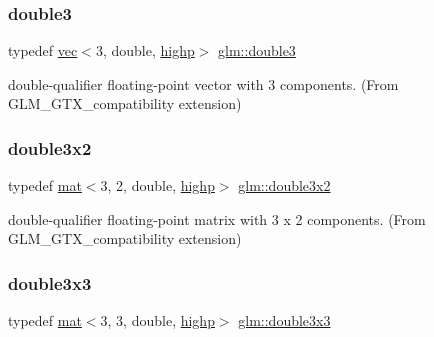 \subsubsection{\texorpdfstring{double3}{double3}}
{\footnotesize\ttfamily typedef \hyperlink{structglm_1_1vec}{vec}$<$3, double, \hyperlink{namespaceglm_a36ed105b07c7746804d7fdc7cc90ff25ac6f7eab42eacbb10d59a58e95e362074}{highp}$>$ \hyperlink{group__gtx__compatibility_ga59c2d0879cea219643aec2f75b8beee9}{glm\+::double3}}



double-\/qualifier floating-\/point vector with 3 components. (From G\+L\+M\+\_\+\+G\+T\+X\+\_\+compatibility extension) 

\mbox{\label{group__gtx__compatibility_ga92075f3b0988e062b5fcd25afb67e74c}} 
\subsubsection{\texorpdfstring{double3x2}{double3x2}}
{\footnotesize\ttfamily typedef \hyperlink{structglm_1_1mat}{mat}$<$3, 2, double, \hyperlink{namespaceglm_a36ed105b07c7746804d7fdc7cc90ff25ac6f7eab42eacbb10d59a58e95e362074}{highp}$>$ \hyperlink{group__gtx__compatibility_ga92075f3b0988e062b5fcd25afb67e74c}{glm\+::double3x2}}



double-\/qualifier floating-\/point matrix with 3 x 2 components. (From G\+L\+M\+\_\+\+G\+T\+X\+\_\+compatibility extension) 

\mbox{\label{group__gtx__compatibility_ga7cf33790969e0985a53ff01d914bf8ef}} 
\subsubsection{\texorpdfstring{double3x3}{double3x3}}
{\footnotesize\ttfamily typedef \hyperlink{structglm_1_1mat}{mat}$<$3, 3, double, \hyperlink{namespaceglm_a36ed105b07c7746804d7fdc7cc90ff25ac6f7eab42eacbb10d59a58e95e362074}{highp}$>$ \hyperlink{group__gtx__compatibility_ga7cf33790969e0985a53ff01d914bf8ef}{glm\+::double3x3}}



